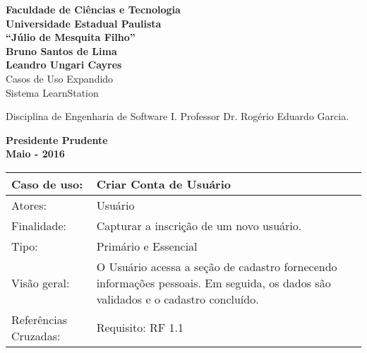 \documentclass[12pt,a4paper,onecolumn,titlepage]{article}
\begin{document}

\begin{titlepage} %
	
	\vfill
	\begin{center}
	
		{\large \textbf{Faculdade de Ciências e Tecnologia\\Universidade Estadual Paulista\\``Júlio de Mesquita Filho''}} \\[3cm]
		{\large \textbf{Bruno Santos de Lima}}\\
		{\large \textbf{Leandro Ungari Cayres}}\\[4cm]
		{\Large Casos de Uso Expandido}\\
		{\Large Sistema LearnStation}\\[4cm]

	\hspace{.45\textwidth} %
	\begin{minipage}{.5\textwidth}
		\large Disciplina de Engenharia de Software I. Professor Dr. Rogério Eduardo Garcia.\\[0.5cm]
	\end{minipage}

	\vfill
	\vspace{1.5cm}
	
	\large \textbf{Presidente Prudente\\}
	\large \textbf{Maio - 2016}
	
	\end{center}
	
\end{titlepage}

\renewcommand{\baselinestretch}{1.1}


\begin{table}[h!]
\begin{center}
\begin{tabular}{p{2.5cm} p{9.5cm}}
Caso de uso: & \textbf{Criar Conta de Usuário} \\ \hline
Atores: & Usuário \\ \hline
Finalidade: & Capturar a inscrição de um novo usuário. \\ \hline
Tipo: & Primário e Essencial\\ \hline
Visão geral: & O Usuário acessa a seção de cadastro fornecendo informações pessoais. Em seguida, os dados são validados e o cadastro concluído. \\ \hline
Referências Cruzadas: & Requisito: RF 1.1

\end{tabular}
\end{center}
\end{table}
\end{document}

